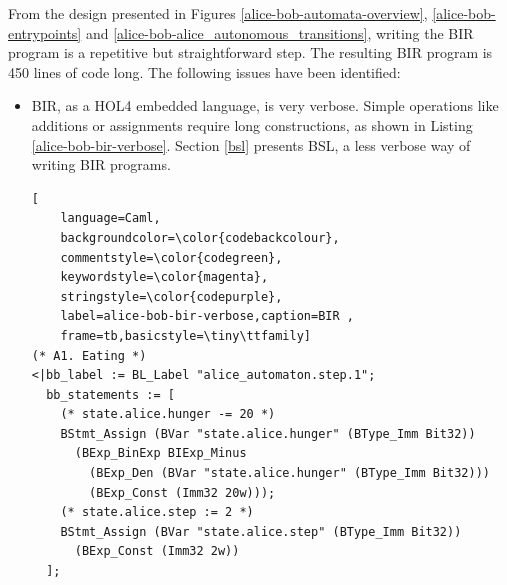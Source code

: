 \documentclass{kththesis}
\begin{document}
From the design presented in Figures \ref{alice-bob-automata-overview}, \ref{alice-bob-entrypoints} and \ref{alice-bob-alice_autonomous_transitions}, writing the BIR program is a repetitive but straightforward step. The resulting BIR program is 450 lines of code long. The following issues have been identified:

\begin{itemize}
    \item BIR, as a HOL4 embedded language, is very verbose. Simple operations like additions or assignments require long constructions, as shown in Listing \ref{alice-bob-bir-verbose}. Section \ref{bsl} presents BSL, a less verbose way of writing BIR programs.
\begin{lstlisting}[
    language=Caml,
    backgroundcolor=\color{codebackcolour},
    commentstyle=\color{codegreen},
    keywordstyle=\color{magenta},
    stringstyle=\color{codepurple},
    label=alice-bob-bir-verbose,caption=BIR ,
    frame=tb,basicstyle=\tiny\ttfamily]
(* A1. Eating *)                                                                                                                     
<|bb_label := BL_Label "alice_automaton.step.1";                                                                                     
  bb_statements := [                                                                                                                 
    (* state.alice.hunger -= 20 *)                                                                                                   
    BStmt_Assign (BVar "state.alice.hunger" (BType_Imm Bit32))                                                                       
      (BExp_BinExp BIExp_Minus                                                                                                       
        (BExp_Den (BVar "state.alice.hunger" (BType_Imm Bit32)))                                                                   
        (BExp_Const (Imm32 20w)));                                                                                                 
    (* state.alice.step := 2 *)                                                                                                      
    BStmt_Assign (BVar "state.alice.step" (BType_Imm Bit32))                                                                         
      (BExp_Const (Imm32 2w))                                                                                                        
  ];                                                                                                                                 

\end{lstlisting}
\end{itemize}
\end{document}
